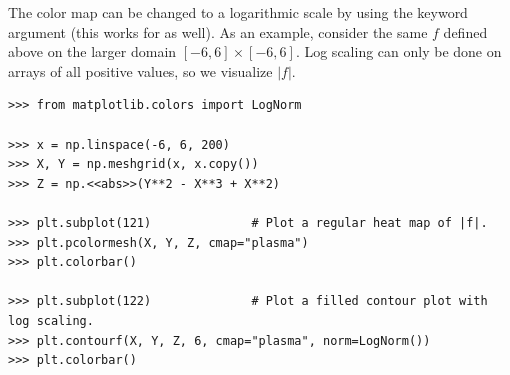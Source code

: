 The color map can be changed to a logarithmic scale by using the keyword argument  (this works for  as well).
As an example, consider the same $f$ defined above on the larger domain $[-6,6]\times [-6,6]$.
Log scaling can only be done on arrays of all positive values, so we visualize $|f|$.

\begin{lstlisting}
>>> from matplotlib.colors import LogNorm

>>> x = np.linspace(-6, 6, 200)
>>> X, Y = np.meshgrid(x, x.copy())
>>> Z = np.<<abs>>(Y**2 - X**3 + X**2)

>>> plt.subplot(121)              # Plot a regular heat map of |f|.
>>> plt.pcolormesh(X, Y, Z, cmap="plasma")
>>> plt.colorbar()

>>> plt.subplot(122)              # Plot a filled contour plot with log scaling.
>>> plt.contourf(X, Y, Z, 6, cmap="plasma", norm=LogNorm())
>>> plt.colorbar()
\end{lstlisting}

